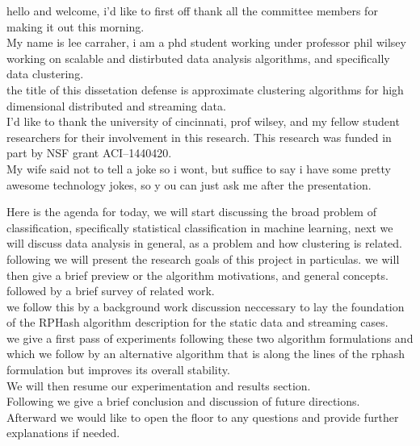 \documentclass{beamer}
\begin{document}
\begin{frame}[plain]
hello and welcome, i'd like to first off thank all the committee members for
making it out this morning.\\
My name is lee carraher, i am a phd student working under professor phil wilsey
working on scalable and distirbuted data analysis algorithms, and specifically
data clustering.\\
the title of this dissetation defense is approximate clustering algorithms for
high dimensional distributed and streaming data.\\
I'd like to thank the university of cincinnati, prof wilsey, and my fellow
student researchers for their involvement in this research. This research was
funded in part by NSF grant ACI–1440420. \\
My wife said not to tell a joke so
i wont, but suffice to say i have some pretty awesome technology jokes, so y
ou can just ask me after the presentation.
\end{frame}

\begin{frame}[plain]
Here is the agenda for today, we will start discussing the broad problem of
classification, specifically statistical classification in machine learning,
next we will discuss data analysis in general, as a problem and how clustering
is related.\\
following we will present the research goals of this project in particulas.
we will then give a brief preview or the algorithm motivations, and general
concepts. followed by a brief survey of related work. \\
we follow this by a background work discussion neccessary to lay the 
foundation of the RPHash algorithm description for the static data and 
streaming cases.\\
we give a first pass of experiments following these two algorithm formulations
and which we follow by an alternative algorithm that is along the lines of the
rphash formulation but improves its overall stability.\\
We will then resume our experimentation and results section. \\
Following we give a brief conclusion and discussion of future directions.\\
Afterward we would like to open the floor
to any questions and provide further explanations if needed.
\end{frame}
\end{document}
